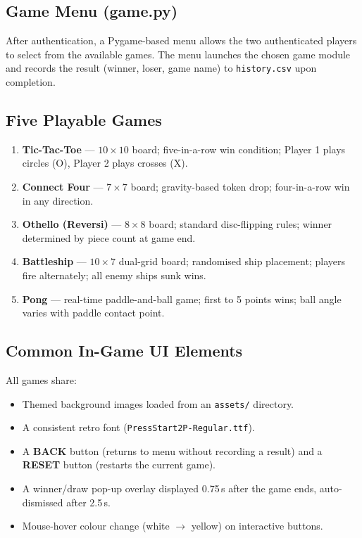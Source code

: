 \documentclass[12pt,a4paper]{article}
\begin{document}
\subsection{Game Menu (game.py)}
After authentication, a Pygame-based menu allows the two authenticated players to select from
the available games. The menu launches the chosen game module and records the result (winner,
loser, game name) to \texttt{history.csv} upon completion.

\subsection{Five Playable Games}
\begin{enumerate}[leftmargin=*]
    \item \textbf{Tic-Tac-Toe} --- $10{\times}10$ board; five-in-a-row win condition; Player 1
          plays circles (O), Player 2 plays crosses (X).
    \item \textbf{Connect Four} --- $7{\times}7$ board; gravity-based token drop; four-in-a-row
          win in any direction.
    \item \textbf{Othello (Reversi)} --- $8{\times}8$ board; standard disc-flipping rules;
          winner determined by piece count at game end.
    \item \textbf{Battleship} --- $10{\times}7$ dual-grid board; randomised ship placement;
          players fire alternately; all enemy ships sunk wins.
    \item \textbf{Pong} --- real-time paddle-and-ball game; first to 5 points wins; ball angle
          varies with paddle contact point.
\end{enumerate}

\subsection{Common In-Game UI Elements}
All games share:
\begin{itemize}[leftmargin=*]
    \item Themed background images loaded from an \texttt{assets/} directory.
    \item A consistent retro font (\texttt{PressStart2P-Regular.ttf}).
    \item A \textbf{BACK} button (returns to menu without recording a result) and a
          \textbf{RESET} button (restarts the current game).
    \item A winner/draw pop-up overlay displayed 0.75\,s after the game ends,
          auto-dismissed after 2.5\,s.
    \item Mouse-hover colour change (white $\to$ yellow) on interactive buttons.
\end{itemize}
\end{document}
